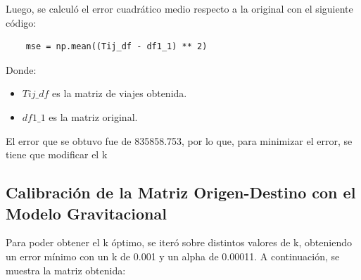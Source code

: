 \documentclass[letterpaper,12pt]{article}
\begin{document}
Luego, se calculó el error cuadrático medio respecto a la original con el siguiente código:


\begin{lstlisting}
    mse = np.mean((Tij_df - df1_1) ** 2)
\end{lstlisting}

Donde:
\begin{itemize}
    \item $Tij\_df$ es la matriz de viajes obtenida.
    \item $df1\_1$ es la matriz original.
\end{itemize}

El error que se obtuvo fue de 835858.753, por lo que, para minimizar el error, se tiene que modificar el k

\subsection{Calibración de la Matriz Origen-Destino con el Modelo Gravitacional}
Para poder obtener el k óptimo, se iteró sobre distintos valores de k, obteniendo un error mínimo con un k de 0.001 y un alpha de 0.00011. A continuación, se muestra la matriz obtenida:
\end{document}
